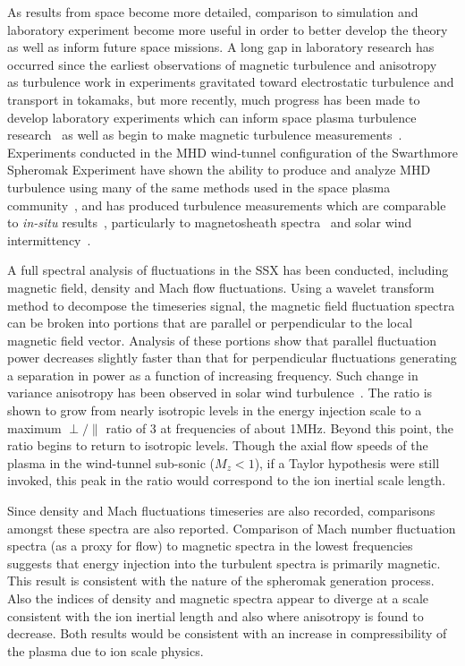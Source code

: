 \documentclass[aip,prl,amsmath,amssymb,reprint,superscriptaddress]{revtex4-1} %
\begin{document}
As results from space become more detailed, comparison to simulation and laboratory experiment become more useful in order to better develop the theory as well as inform future space missions. A long gap in laboratory research has occurred since the earliest observations of magnetic turbulence and anisotropy~\cite{robinson71} as turbulence work in experiments gravitated toward electrostatic turbulence and transport in tokamaks, but more recently, much progress has been made to develop laboratory experiments which can inform space plasma turbulence research~\cite{howes12a} as well as begin to make magnetic turbulence measurements~\cite{ren11}. Experiments conducted in the MHD wind-tunnel configuration of the Swarthmore Spheromak Experiment have shown the ability to produce and analyze MHD turbulence using many of the same methods used in the space plasma community~\cite{deWit13}, and has produced turbulence measurements which are comparable to \textit{in-situ} results~\cite{schaffner14a,schaffner14b}, particularly to magnetosheath spectra~\cite{yordanova08} and solar wind intermittency~\cite{sorrisovalvo99}.

A full spectral analysis of fluctuations in the SSX has been conducted, including magnetic field, density and Mach flow fluctuations. Using a wavelet transform method to decompose the timeseries signal, the magnetic field fluctuation spectra can be broken into portions that are parallel or perpendicular to the local magnetic field vector. Analysis of these portions show that parallel fluctuation power decreases slightly faster than that for perpendicular fluctuations generating a separation in power as a function of increasing frequency. Such change in variance anisotropy has been observed in solar wind turbulence~\cite{kiyani13}. The ratio is shown to grow from nearly isotropic levels in the energy injection scale to a maximum $\perp/\parallel$ ratio of 3 at frequencies of about 1MHz. Beyond this point, the ratio begins to return to isotropic levels. Though the axial flow speeds of the plasma in the wind-tunnel sub-sonic ($M_{z} < 1$), if a Taylor hypothesis were still invoked, this peak in the ratio would correspond to the ion inertial scale length. 

Since density and Mach fluctuations timeseries are also recorded, comparisons amongst these spectra are also reported. Comparison of Mach number fluctuation spectra (as a proxy for flow) to magnetic spectra in the lowest frequencies suggests that energy injection into the turbulent spectra is primarily magnetic. This result is consistent with the nature of the spheromak generation process. Also the indices of density and magnetic spectra appear to diverge at a scale consistent with the ion inertial length and also where anisotropy is found to decrease. Both results would be consistent with an increase in compressibility of the plasma due to ion scale physics.
\end{document}
